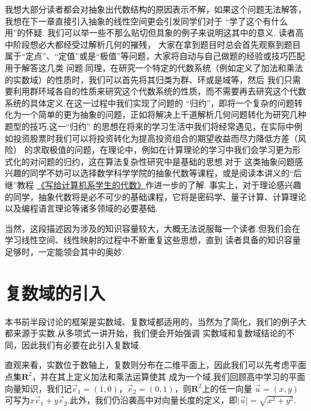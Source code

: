 我想大部分读者都会对抽象出代数结构的原因表示不解，如果这个问题无法解答，我想在下一章直接引入抽象的线性空间更会引发同学们对于
``学了这个有什么用''的怀疑. 我们可以举一些不那么贴切但具象的例子来说明这其中的意义. 读者高中阶段想必大都经受过解析几何的摧残，
大家在拿到题目时总会首先观察到题目属于``定点''、``定值''或是``极值''等问题，大家将自动与自己做题的经验或技巧匹配用于解答这几类
问题.同理，在研究一个特定的代数系统（例如定义了加法和乘法的实数域）的性质时，我们可以首先将其归类为群、环或是域等，然后
我们只需要利用群环域各自的性质来研究这个代数系统的性质，而不需要再去研究这个代数系统的具体定义.在这一过程中我们实现了问题的
``归约''，即将一个复杂的问题转化为一个简单的更为抽象的问题，正如将解决上千道解析几何问题转化为研究几种题型的技巧.这一``归约''
的思想在将来的学习生活中我们将经常遇见，在实际中例如投资股票时我们可以将投资转化为提高投资组合的期望收益而尽力降低方差（风险）
的求取极值的问题，在理论中，例如在计算理论的学习中我们会学习更为形式化的对问题的归约，这在算法复杂性研究中是基础的思想.对于
这类抽象问题感兴趣的同学不妨可以选择数学科学学院的抽象代数等课程，或是阅读本讲义的``后继''教程
\href{https://frightenedfoxcn.github.io/notes/series/alg-for-cs/}{《写给计算机系学生的代数》}作进一步的了解.
事实上，对于理论感兴趣的同学，抽象代数将是必不可少的基础课程，它将是密码学、量子计算、计算理论以及编程语言理论等诸多领域的必要基础.

当然，这段描述因为涉及的知识容量较大，大概无法说服每一个读者.但我们会在学习线性空间、线性映射的过程中不断重复这些思想，直到
读者具备的知识容量足够时，一定能领会其中的奥妙.

\section{复数域的引入}
本书前半段讨论的框架是实数域、复数域都适用的，当然为了简化，我们的例子大都来源于实数.从多项式一讲开始，我们便会开始强调
实数域和复数域结论的不同，因此我们有必要在此引入复数域.

直观来看，实数位于数轴上，复数则分布在二维平面上，因此我们可以先考虑平面点集$\mathbf{R}^2$，并在其上定义加法和乘法运算使其
成为一个域.我们回顾高中学习的平面向量知识，我们记$\vec{e}_1=(1,0)$，$\vec{e}_2=(0,1)$，则$\mathbf{R}^2$上的任一向量
$\vec{u}=(x,y)$可写为$x\vec{e}_1+y\vec{e}_2$.此外，我们仍沿袭高中对向量长度的定义，即$\lvert\vec{u}\rvert=\sqrt{x^2+y^2}$.

